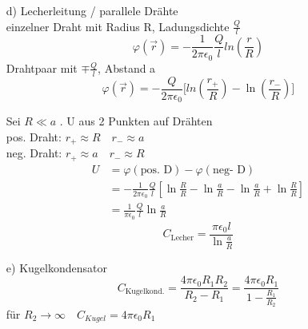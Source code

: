 \documentclass[titlepage,12pt,a4paper,ngerman]{report}
\newcommand{\tx}[1]{\textrm{#1}}
\begin{document}
\begin{itemize}
\begin{itemize}

\item[d)] Lecherleitung / parallele Drähte\\
einzelner Draht mit Radius R, Ladungsdichte $\frac{Q}{l}$
$$\varphi(\vec{r}) =-\frac{1}{2\pi\epsilon_0} \frac{Q}{l} ln(\frac{r}{R})$$
Drahtpaar mit $\mp \frac{Q}{l}$, Abstand a
$$ \varphi(\vec{r}) = -\frac{Q}{2\pi\epsilon_0} \bigg[ ln(\frac{r_+}{R}) - \ln(\frac{r_-}{R}) \bigg]$$

Sei $ R \ll a$ . U aus 2 Punkten auf Drähten\\
pos. Draht: $r_+ \approx R \quad r_- \approx a$\\
neg. Draht: $r_+ \approx a \quad r_- \approx R$\\

\begin{align*}
U &= \varphi(\tx{pos. D}) - \varphi(\tx{neg- D})\\
&= -\frac{1}{2\pi\epsilon_0} \frac{Q}{l} [\ln\frac{R}{R} - \ln\frac{a}{R} - \ln\frac{a}{R} + \ln\frac{R}{R}] \\
&= \frac{1}{\pi \epsilon_0} \frac{Q}{l} \ln\frac{a}{R}
\end{align*}
$$C_{\tx{Lecher}} = \frac{\pi\epsilon_0 l}{\ln\frac{a}{R}}$$


\item[e)] Kugelkondensator 
$$C_{\textrm{Kugelkond.}} = \frac{4 \pi \epsilon_0 R_1 R_2}{R_2 - R_1} = \frac{4 \pi\epsilon_0 R_1}{1 - \frac{R_1}{R_2}}$$
für $R_2 \rightarrow \infty \quad C_{Kugel} = 4 \pi \epsilon_0 R_1$

\end{itemize}

\end{itemize}
\end{document}
